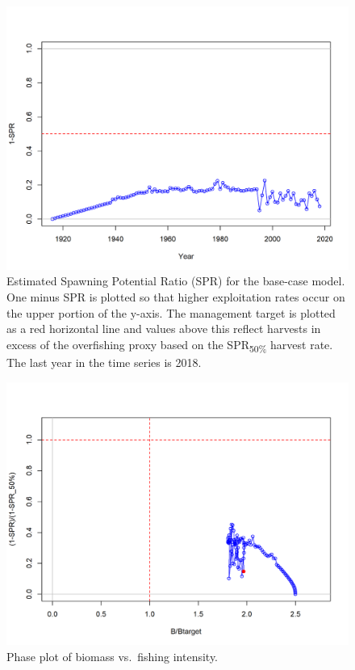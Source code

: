 \documentclass[12pt,]{article}
\begin{document}
\begin{figure}
\centering
\includegraphics{r4ss/plots_mod1/SPR2_minusSPRseries.png}
\caption{Estimated Spawning Potential Ratio (SPR) for the base-case
model. One minus SPR is plotted so that higher exploitation rates occur
on the upper portion of the y-axis. The management target is plotted as
a red horizontal line and values above this reflect harvests in excess
of the overfishing proxy based on the SPR\textsubscript{50\%} harvest
rate. The last year in the time series is 2018. \label{fig:SPR_all}}
\end{figure}

\begin{figure}
\centering
\includegraphics{r4ss/plots_mod1/SPR4_phase.png}
\caption{Phase plot of biomass vs.~fishing intensity. \label{fig:phase}}
\end{figure}
\end{document}
